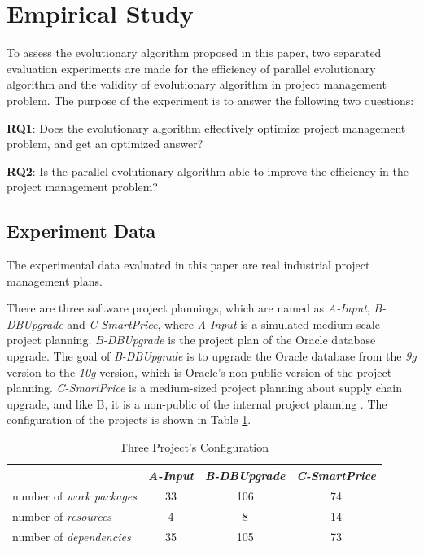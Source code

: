 %
%

\section{Empirical Study}
%
To assess the evolutionary algorithm proposed in this paper, two separated
evaluation experiments are made for the efficiency of parallel evolutionary
algorithm and the validity of evolutionary algorithm in project management
problem. The purpose of the experiment is to answer the following two questions:


\textbf{RQ1}: Does the evolutionary algorithm effectively optimize project
management problem, and get an optimized answer?

\textbf{RQ2}: Is the parallel evolutionary algorithm able to improve the
efficiency in the project management problem?


\subsection{Experiment Data}
%
The experimental data evaluated in this paper are real industrial project
management plans.


There are three software project plannings, which are named as \emph{A-Input},
\emph{B-DBUpgrade} and \emph{C-SmartPrice}, where \emph{A-Input} is a simulated
medium-scale project planning. \emph{B-DBUpgrade} is the project plan of the
Oracle database upgrade. The goal of \emph{B-DBUpgrade} is to upgrade the Oracle
database from the \emph{9g} version to the \emph{10g} version, which is Oracle's
non-public version of the project planning. \emph{C-SmartPrice} is a
medium-sized project planning about supply chain upgrade, and like B, it is a
non-public of the internal project planning \cite{ren}. The configuration of the
projects is shown in Table \ref{tab:statis}.

\begin{table}
  \centering
  \caption{Three Project's Configuration}
  \label{tab:statis}
  \begin{tabular}{lccc}
    \hline
      & \emph{ A-Input } & \emph{ B-DBUpgrade } & \emph{ C-SmartPrice } \\
    \hline
    number of \emph{work packages} & 33 & 106 & 74 \\
    number of \emph{resources}     & 4  & 8   & 14 \\
    number of \emph{dependencies}  & 35 & 105 & 73 \\
    \hline
  \end{tabular}
\end{table}


